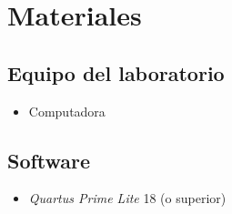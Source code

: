 \documentclass[../main.tex]{subfiles}
\begin{document}
\section{Materiales}
\subsection*{Equipo del laboratorio}
\begin{itemize}
  \item Computadora
\end{itemize}
\subsection*{Software}
\begin{itemize}
  \item \textit{Quartus Prime Lite} 18 (o superior)
\end{itemize}

\newpage
\end{document}
